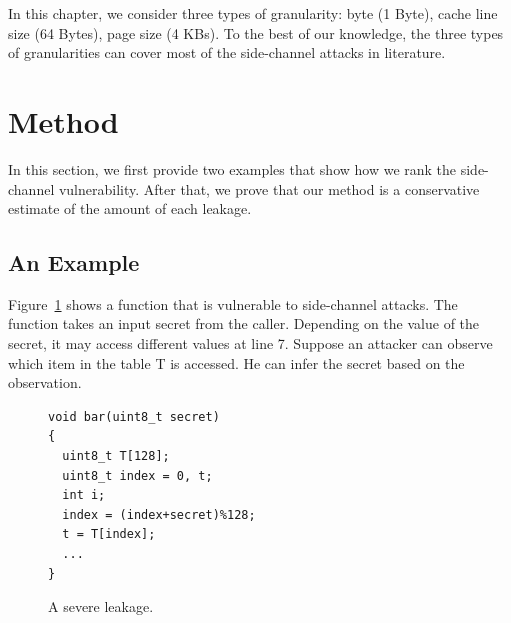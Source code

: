In this chapter, we consider three types of granularity: byte (1 Byte), cache line size (64 Bytes), page size (4 KBs). To the best of our knowledge, the three types of granularities can cover most of the side-channel attacks in literature.

\section{Method}
In this section, we first provide two examples that show how we rank the side-channel vulnerability. After that, we prove that our method is a conservative estimate of the amount of each leakage.

\subsection{An Example}
Figure~\ref{chapter5:fig:example1} shows a function that is vulnerable to side-channel attacks. The function takes an input secret from the caller. Depending on the value of the secret, it may access different values at line 7. Suppose an attacker can observe which item in the table \textsf{T} is accessed. He can infer the secret based on the observation.

\begin{figure}[h]
  \begin{minipage}{0.6\linewidth}
    \begin{lstlisting}[xleftmargin=.15\textwidth,xrightmargin=.30\textwidth]
void bar(uint8_t secret)
{
  uint8_t T[128];
  uint8_t index = 0, t;
  int i;
  index = (index+secret)%128;
  t = T[index];
  ...
}
\end{lstlisting}
  \end{minipage}
  \hfill
  \begin{minipage}{0.4\linewidth}
  \end{minipage}
  \caption{A severe leakage.}\label{chapter5:fig:example1}
\end{figure}

